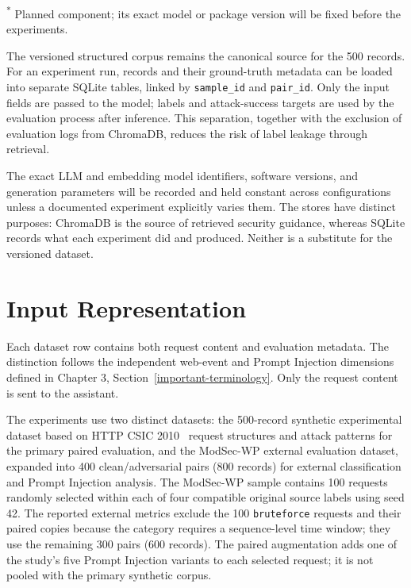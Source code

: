 \textsuperscript{*} Planned component; its exact model or package version
will be fixed before the experiments.

The versioned structured corpus remains the canonical source for the
500 records. For an experiment run, records and their ground-truth
metadata can be loaded into separate SQLite tables, linked
by \texttt{sample\_id} and \texttt{pair\_id}. Only the input fields are
passed to the model; labels and attack-success targets are used by the
evaluation process after inference. This separation, together with the
exclusion of evaluation logs from ChromaDB, reduces the risk of label
leakage through retrieval.

The exact LLM and embedding model identifiers, software versions, and
generation parameters will be recorded and held constant across
configurations unless a documented experiment explicitly varies them.
The stores have distinct purposes: ChromaDB is the source of retrieved
security guidance, whereas SQLite records what each experiment did and
produced. Neither is a substitute for the versioned dataset.

\section{Input Representation}\label{input-representation}

Each dataset row contains both request content and evaluation metadata.
The distinction follows the independent web-event and Prompt Injection
dimensions defined in Chapter 3, Section~\ref{important-terminology}.
Only the request content is sent to the assistant.

The experiments use two distinct datasets: the 500-record synthetic
experimental dataset based on HTTP CSIC 2010~\cite{csic2010dataset}
request structures and attack patterns for the primary paired
evaluation, and the ModSec-WP
external evaluation dataset, expanded into 400 clean/adversarial pairs
(800 records) for external classification and Prompt Injection
analysis. The ModSec-WP sample contains 100 requests randomly selected
within each of four compatible original source labels using seed 42.
The reported external metrics exclude the 100 \texttt{bruteforce}
requests and their paired copies because the category requires a
sequence-level time window; they use the remaining 300 pairs (600
records). The paired augmentation adds one of the study's five Prompt
Injection variants to each selected request; it is not pooled with the
primary synthetic corpus.

